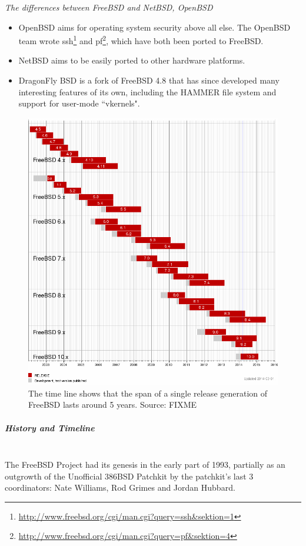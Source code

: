 \documentclass[11pt]{article} %
\begin{document}
\textit{The differences between FreeBSD and NetBSD, OpenBSD}
\begin{itemize}
\item OpenBSD aims for operating system security above all else. The OpenBSD team wrote ssh\footnote{\url{http://www.freebsd.org/cgi/man.cgi?query=ssh&sektion=1}} and pf\footnote{\url{http://www.freebsd.org/cgi/man.cgi?query=pf&sektion=4}}, which have both been ported to FreeBSD.
\item NetBSD aims to be easily ported to other hardware platforms.
\item  DragonFly BSD is a fork of FreeBSD 4.8 that has since developed many interesting features of its own, including the HAMMER file system and support for user-mode ``vkernels".
\end{itemize}
       \begin{figure}
   \centering
        \includegraphics[scale=0.4]{./freebsd.png}
     \caption{ The time line shows that the span of a single release generation of FreeBSD lasts around 5 years. Source: FIXME}
      \end{figure}


  \subparagraph{History and Timeline} \mbox{} \\
The FreeBSD Project had its genesis in the early part of 1993, partially as an outgrowth of the Unofficial 386BSD Patchkit by the patchkit's last 3 coordinators: Nate Williams, Rod Grimes and Jordan Hubbard.
\end{document}
